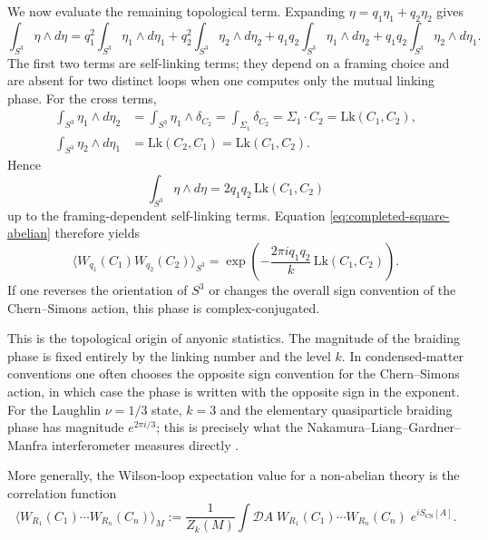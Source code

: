 \documentclass[11pt]{article}
\newcommand{\CS}{\operatorname{CS}}
\theoremstyle{definition}
\numberwithin{theorem}{section}
\numberwithin{equation}{section}
\begin{document}
\begin{example}
\noindent We now evaluate the remaining topological term. Expanding $\eta = q_1\eta_1 + q_2\eta_2$ gives
\begin{equation*}
\int_{S^3}\eta\wedge d\eta
=
q_1^2\int_{S^3}\eta_1\wedge d\eta_1
+ q_2^2\int_{S^3}\eta_2\wedge d\eta_2
+ q_1q_2\int_{S^3}\eta_1\wedge d\eta_2
+ q_1q_2\int_{S^3}\eta_2\wedge d\eta_1.
\end{equation*}
The first two terms are self-linking terms; they depend on a framing choice and are absent for two distinct loops when one computes only the mutual linking phase. For the cross terms,
\begin{align*}
\int_{S^3}\eta_1\wedge d\eta_2
&=
\int_{S^3}\eta_1\wedge \delta_{C_2}
=
\int_{\Sigma_1}\delta_{C_2}
=
\Sigma_1\cdot C_2
=
\mathrm{Lk}(C_1,C_2), \\
\int_{S^3}\eta_2\wedge d\eta_1
&=
\mathrm{Lk}(C_2,C_1)
=
\mathrm{Lk}(C_1,C_2).
\end{align*}
Hence
\begin{equation*}
\int_{S^3}\eta\wedge d\eta = 2q_1q_2\,\mathrm{Lk}(C_1,C_2)
\end{equation*}
up to the framing-dependent self-linking terms. Equation \eqref{eq:completed-square-abelian} therefore yields
\begin{equation*}
\langle W_{q_1}(C_1)W_{q_2}(C_2)\rangle_{S^3}
=
\exp\left(-\frac{2\pi i q_1 q_2}{k}\,\mathrm{Lk}(C_1,C_2)\right).
\end{equation*}
If one reverses the orientation of $S^3$ or changes the overall sign convention of the Chern--Simons action, this phase is complex-conjugated.

\medskip

\noindent This is the topological origin of anyonic statistics. The magnitude of the braiding phase is fixed entirely by the linking number and the level $k$. In condensed-matter conventions one often chooses the opposite sign convention for the Chern--Simons action, in which case the phase is written with the opposite sign in the exponent. For the Laughlin $\nu = 1/3$ state, $k=3$ and the elementary quasiparticle braiding phase has magnitude $e^{2\pi i/3}$; this is precisely what the Nakamura--Liang--Gardner--Manfra interferometer measures directly \cite{Nakamura2020}.
\end{example}

\noindent More generally, the Wilson-loop expectation value for a non-abelian theory is the correlation function
\begin{equation}\label{eq:Wilson-expectation}
\langle W_{R_1}(C_1)\cdots W_{R_n}(C_n)\rangle_M := \frac{1}{Z_k(M)}\int \mathcal{D}A\; W_{R_1}(C_1)\cdots W_{R_n}(C_n)\; e^{iS_{\CS}[A]}.
\end{equation}
\end{document}
